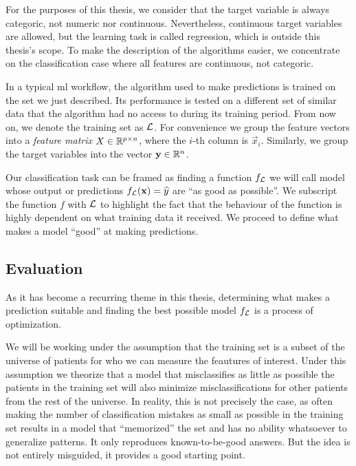For the purposes of this thesis, we consider that the target variable is always
categoric, not numeric nor continuous. Nevertheless, continuous target variables
are allowed, but the learning task is called regression, which is outside this
thesis's scope. To make the description of the algorithms easier, we concentrate
on the classification case where all features are continuous, not categoric.

In a typical \ac{ml} workflow, the algorithm used to make predictions is trained
on the set we just described. Its performance is tested on a different set of
similar data that the algorithm had no access to during its training period.
From now on, we denote the training set as $\mathcal{L}$. For convenience we group the
feature vectors into a \textit{feature matrix} $X \in \mathbb{R}^{p \times n}$, where
the $i$-th column is $\vec{x}_i$. Similarly, we group the target variables into
the vector $\mathbf{y} \in \mathbb{R}^{n}$.

Our classification task can be framed as finding a function $f_{\mathcal{L}}$ we will
call model whose output or predictions $f_{\mathcal{L}} (\mathbf{x}) = \widehat{y}$ are ``as
good as possible''. We subscript the function $f$ with $\mathcal{L}$ to highlight the
fact that the behaviour of the function is highly dependent on what training
data it received. We proceed to define what makes a model ``good'' at making
predictions.

\subsection{Evaluation}

As it has become a recurring theme in this thesis, determining what makes a
prediction suitable and finding the best possible model $f_{\mathcal{L}}$ is a process of
optimization. 

We will be working under the assumption that the training set is a subset of the
universe of patients for who we can measure the feautures of interest. Under
this assumption we theorize that a model that misclassifies as little as
possible the patients in the training set will also minimize misclassifications
for other patients from the rest of the universe. In reality, this is not
precisely the case, as often making the number of classification mistakes as
small as possible in the training set results in a model that ``memorized'' the
set and has no ability whatsoever to generalize patterns. It only reproduces
known-to-be-good answers. But the idea is not entirely misguided, it provides a
good starting point.


